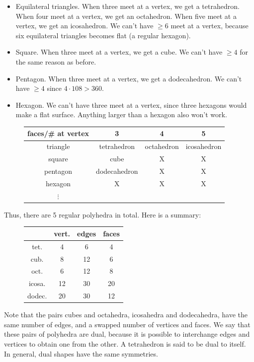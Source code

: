 \begin{itemize}
    \item Equilateral triangles. When three meet at a vertex, we get a tetrahedron. When four meet at a vertex, we get an octahedron. When five meet at a vertex, we get an icosahedron. We can't have $\geq 6$ meet at a vertex, because six equilateral triangles becomes flat (a regular hexagon).
    \item Square. When three meet at a vertex, we get a cube. We can't have $\geq 4$ for the same reason as before.
    \item Pentagon. When three meet at a vertex, we get a dodecahedron. We can't have $\geq 4$ since $4\cdot 108 > 360$.
    \item Hexagon. We can't have three meet at a vertex, since three hexagons would make a flat surface. Anything larger than a hexagon also won't work.
\end{itemize}

\begin{figure}[h]
\centering
\begin{tabular}{cccc}
\hline
    faces/\# at vertex & 3 & 4 & 5 \\
\hline
    triangle & tetrahedron & octahedron & icosahedron \\
    square & cube & X & X\\
    pentagon & dodecahedron & X & X\\
    hexagon & X & X & X \\
    $\vdots$ & & & \\ 
\end{tabular}
\end{figure}

Thus, there are \ac{5} regular polyhedra in total. Here is a summary:

\begin{figure}[H]
\centering
\begin{tabular}{cccc}
\hline
    & vert. & edges & faces \\
\hline
    tet. & 4&6&4\\
    cub. & 8&12&6\\
    oct. & 6&12&8\\
    icosa. & 12&30&20\\
    dodec. & 20&30&12
\end{tabular}
\end{figure}

Note that the pairs cubes and octahedra, icosahedra and dodecahedra, have the same number of edges, and a swapped number of vertices and faces. We say that these pairs of polyhedra are \ac{dual}, because it is possible to interchange edges and vertices to obtain one from the other. A tetrahedron is said to be dual to itself. In general, dual shapes have the same symmetries. 

